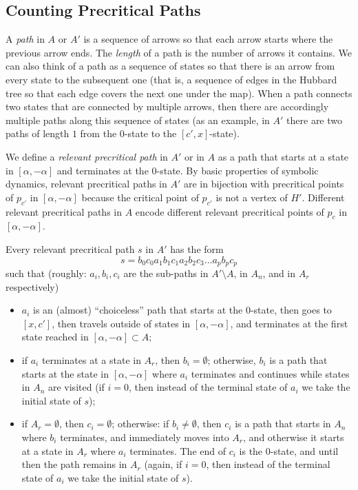 \documentclass[12pt]{amsart}
\newcommand{\0}{\texttt{0}}
\newcommand{\1}{\texttt{1}}
\theoremstyle{definition}
\numberwithin{equation}{section}
\begin{document}

\subsection{Counting Precritical Paths}
\label{Sub:CountingPaths}
A \emph{path} in $A$ or $A'$ is a sequence of arrows so that each arrow starts where the previous arrow ends. The \emph{length} of a path is the number of arrows it contains.  We can also think of a path as a sequence of states so that there is an arrow from every state to the subsequent one (that is, a sequence of edges in the Hubbard tree so that each edge covers the next one under the map). When a path connects two states that are connected by multiple arrows, then there are accordingly multiple paths along this sequence of states (as an example, in $A'$ there are two paths of length $1$ from the $0$-state to the $[c',x]$-state).  



We define a \emph{relevant precritical path} in $A'$ or in $A$ as a path that starts at a state in $[\alpha,-\alpha]$ and terminates at the $0$-state.  By basic properties of symbolic dynamics, relevant precritical paths in $A'$ are in bijection with precritical points of $p_{c'}$ in $[\alpha,-\alpha]$ because the critical point of $p_{c'}$ is not a vertex of $H'$. Different relevant precritical paths in $A$ encode different relevant precritical points of $p_c$ in $[\alpha,-\alpha]$.

Every relevant precritical path $s$ in $A'$ has the form  
\begin{equation}
\label{eq:DecompOfs}
s=b_0c_0a_1b_1c_1a_2b_2c_3\dots a_pb_pc_p
\end{equation}
such that (roughly: $a_i, b_i, c_i$ are the sub-paths in $  A'\setminus A$, in $A_n$, and in $A_r$ respectively)
\begin{itemize}
\item 
$a_i$ is an (almost) ``choiceless''  path that starts at the $0$-state, then goes to $[x,c']$, then travels outside of states in $[\alpha, -\alpha]$, and terminates at the first state reached in $[\alpha,-\alpha]\subset A$;
\item 
if $a_i$ terminates at a state in $A_r$, then $b_i=\emptyset$; otherwise, $b_i$ is a path that starts at the state in $[\alpha,-\alpha]$ where $a_i$ terminates and continues while states in $A_n$ are visited (if $i=0$, then instead of the terminal state of $a_i$ we take the initial state of $s$); 
\item 
if $A_r=\emptyset$, then $c_i=\emptyset$; otherwise: if $b_i\not=\emptyset$, then $c_i$ is a path that starts in $A_n$ where $b_i$ terminates, and immediately moves into $A_r$, and otherwise it starts at a state in $A_r$ where $a_i$ terminates. The end of $c_i$ is the $0$-state, and until then the path remains in $A_r$ (again, if $i=0$, then instead of the terminal state of $a_i$ we take the initial state of $s$).
\end{itemize}
\end{document}
